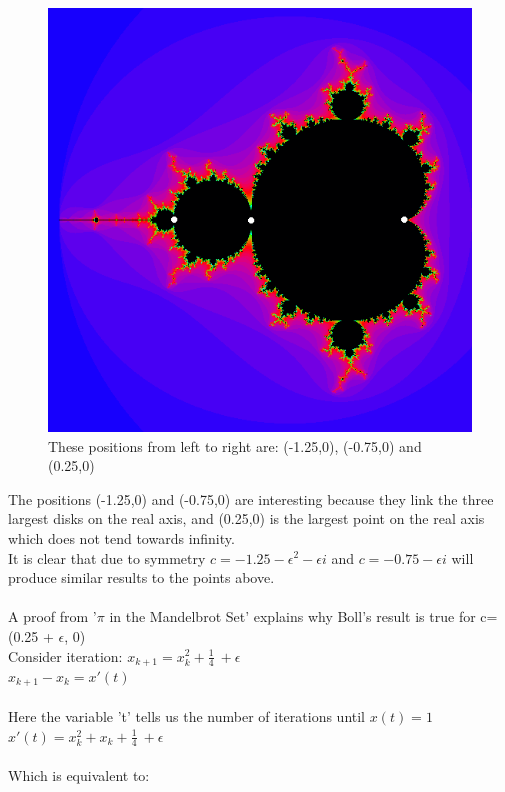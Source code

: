 \documentclass[a4wide, 10pt]{article}
\begin{document}
\begin{figure}[H]
\centering
\includegraphics[scale=0.4]{MandelbrotSet/mandelbrotdot.png}
\caption{These positions from left to right are: (-1.25,0), (-0.75,0) and (0.25,0)}
\end{figure}
The positions (-1.25,0) and (-0.75,0) are interesting because they link the three largest disks on the real axis, and (0.25,0) is the largest point on the real axis which does not tend towards infinity.
\\It is clear that due to symmetry $c = -1.25 - \epsilon^2 - \epsilon i$ and $c = -0.75 - \epsilon i$ will produce similar results to the points above.\\
\\A proof from '$\pi$ in the Mandelbrot Set'\cite{boll proof} explains why Boll's result is true for c=(0.25 + $\epsilon$, 0)
\\Consider iteration:
$x_{k+1} = x^2_{k} + \frac{1}{4}\ + \epsilon$
\\$x_{k+1} - x_{k} = x'(t)$\\
\\Here the variable 't' tells us the number of iterations until $x(t)=1$
\\$x'(t) = x^2_{k} + x_{k} + \frac{1}{4}\ + \epsilon$\\
\\Which is equivalent to:
\end{document}
